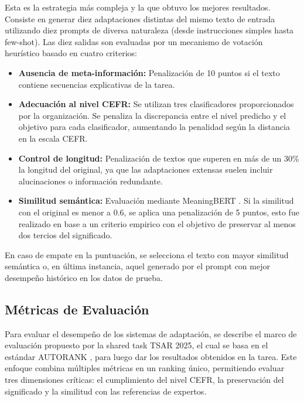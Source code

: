 Esta es la estrategia más compleja y la que obtuvo los mejores resultados. Consiste en generar diez adaptaciones distintas del mismo texto de entrada utilizando diez prompts de diversa naturaleza (desde instrucciones simples hasta few-shot). Las diez salidas son evaluadas por un mecanismo de votación heurístico basado en cuatro criterios:

\begin{itemize}
\item \textbf{Ausencia de meta-información:} Penalización de 10 puntos si el texto contiene secuencias explicativas de la tarea.
\item \textbf{Adecuación al nivel CEFR:} Se utilizan tres clasificadores proporcionados por la organización. Se penaliza la discrepancia entre el nivel predicho y el objetivo para cada clasificador, aumentando la penalidad según la distancia en la escala CEFR.
\item \textbf{Control de longitud:} Penalización de textos que superen en más de un 30\% la longitud del original, ya que las adaptaciones extensas suelen incluir alucinaciones o información redundante.
\item \textbf{Similitud semántica:} Evaluación mediante MeaningBERT \parencite{Beauchemin2023}. Si la similitud con el original es menor a 0.6, se aplica una penalización de 5 puntos, esto fue realizado en base a un criterio empirico con el objetivo de preservar al menos dos tercios del significado.
\end{itemize}

En caso de empate en la puntuación, se selecciona el texto con mayor similitud semántica o, en última instancia, aquel generado por el prompt con mejor desempeño histórico en los datos de prueba.

\subsection{Métricas de Evaluación}\label{subsection:ad_metricas}

Para evaluar el desempeño de los sistemas de adaptación, se describe el marco de evaluación propuesto por la shared task TSAR 2025, el cual se basa en el estándar AUTORANK \parencite{Kocmi2025}, para luego dar los resultados obtenidos en la tarea. Este enfoque combina múltiples métricas en un ranking único, permitiendo evaluar tres dimensiones críticas: el cumplimiento del nivel CEFR, la preservación del significado y la similitud con las referencias de expertos.

